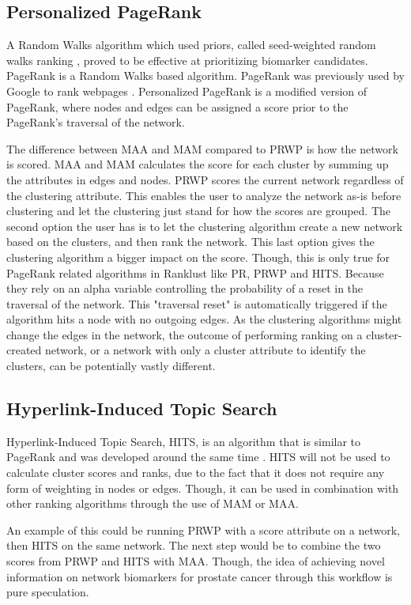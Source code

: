 \subsection{Personalized PageRank}
A Random Walks algorithm which used priors, called seed-weighted random walks
ranking \cite{sw-rwr}, proved to be effective at prioritizing biomarker
candidates. PageRank is a Random Walks based algorithm. PageRank was previously
used by Google to rank webpages \cite{pagerank}. Personalized PageRank is a
modified version of PageRank, where nodes and edges can be assigned a score
prior to the PageRank's traversal of the network.

The difference between MAA and MAM compared to PRWP is how the network is
scored. MAA and MAM calculates the score for each cluster by summing up the
attributes in edges and nodes. PRWP scores the current network regardless of
the clustering attribute. This enables the user to analyze the network as-is
before clustering and let the clustering just stand for how the scores are
grouped. The second option the user has is to let the clustering algorithm
create a new network based on the clusters, and then rank the network. This last
option gives the clustering algorithm a bigger impact on the score. Though, this
is only true for PageRank related algorithms in Ranklust like PR, PRWP and HITS.
Because they rely on an alpha variable controlling the probability of a reset in
the traversal of the network. This "traversal reset" is automatically
triggered if the algorithm hits a node with no outgoing edges. As the clustering
algorithms might change the edges in the network, the outcome of performing
ranking on a cluster-created network, or a network with only a cluster attribute
to identify the clusters, can be potentially vastly different.

\subsection{Hyperlink-Induced Topic Search}
Hyperlink-Induced Topic Search, HITS, is an algorithm that is similar to
PageRank and was developed around the same time \cite{hits}\cite{hits-origin}.
HITS will not be used to calculate cluster scores and ranks, due to the fact
that it does not require any form of weighting in nodes or edges. Though, it can
be used in combination with other ranking algorithms through the use of MAM or
MAA. 

An example of this could be running PRWP with a score attribute on a
network, then HITS on the same network. The next step would be to combine the
two scores from PRWP and HITS with MAA. Though, the idea of achieving novel
information on network biomarkers for prostate cancer through this workflow is
pure speculation.

